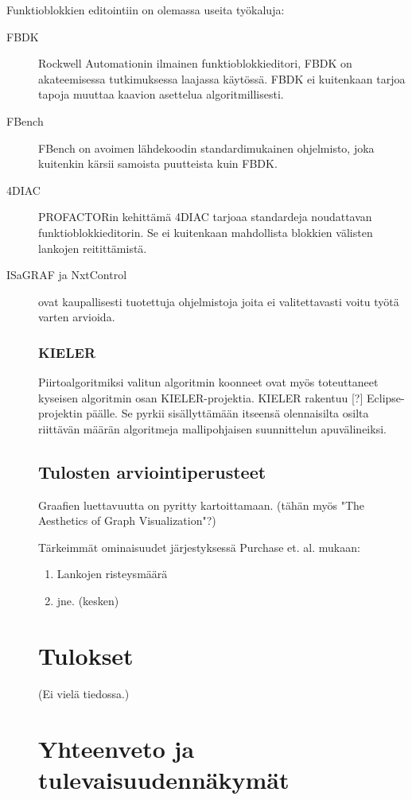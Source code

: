\documentclass[finnish,12pt]{article}
\begin{document}
Funktioblokkien editointiin on olemassa useita työkaluja:
\begin{description}
\item[FBDK] Rockwell Automationin ilmainen funktioblokkieditori, FBDK on akateemisessa tutkimuksessa laajassa käytössä. FBDK ei kuitenkaan tarjoa tapoja muuttaa kaavion asettelua algoritmillisesti.
\item[FBench] FBench on avoimen lähdekoodin standardimukainen ohjelmisto, joka kuitenkin kärsii samoista puutteista kuin FBDK.
\item[4DIAC] PROFACTORin kehittämä 4DIAC tarjoaa standardeja noudattavan funktioblokkieditorin.
Se ei kuitenkaan mahdollista blokkien välisten lankojen reitittämistä. 
\item[ISaGRAF ja NxtControl] ovat kaupallisesti tuotettuja ohjelmistoja joita ei valitettavasti voitu työtä varten arvioida.

			\subsubsection{KIELER}

Piirtoalgoritmiksi valitun algoritmin koonneet ovat myös toteuttaneet kyseisen algoritmin osan KIELER-projektia.
KIELER rakentuu [?] Eclipse-projektin päälle. Se pyrkii sisällyttämään itseensä olennaisilta osilta riittävän määrän algoritmeja mallipohjaisen suunnittelun apuvälineiksi.

		\subsection{Tulosten arviointiperusteet}

Graafien luettavuutta on pyritty kartoittamaan. \cite{RefWorks:47}
(tähän myös "The Aesthetics of Graph Visualization"?)

Tärkeimmät ominaisuudet järjestyksessä Purchase et. al. mukaan: 
\begin{enumerate}
  \item Lankojen risteysmäärä
  \item jne. (kesken)
\end{enumerate}


	\clearpage
	\section{Tulokset}
	
(Ei vielä tiedossa.)

	\section{Yhteenveto ja tulevaisuudennäkymät}


\end{description}
\end{document}
